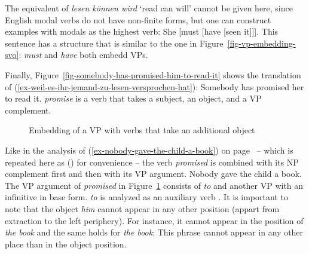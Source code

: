 The equivalent of \emph{lesen können wird} `read can will' cannot be given here, since English modal
verbs do not have non-finite forms, but one can construct examples with modals as the highest verb:
\ea
She [must [have [seen it]]].
\z
This sentence has a structure that is similar to the one in Figure~\ref{fig-vp-embedding-svo}:
\emph{must} and \emph{have} both embedd VPs.

Finally, Figure~\vref{fig-somebody-has-promised-him-to-read-it} shows the translation of
(\ref{ex-weil-es-ihr-jemand-zu-lesen-versprochen-hat}):
\ea
Somebody has promised her to read it.
\z
\emph{promise} is a verb that takes a subject, an object, and a VP complement. 
\begin{figure}
\caption{\label{fig-somebody-has-promised-him-to-read-it}Embedding of a VP with verbs that take an
  additional object}
\end{figure}
Like in the analysis of (\ref{ex-nobody-gave-the-child-a-book}) on
page~\pageref{ex-nobody-gave-the-child-a-book} -- which is repeated here as () for convenience
-- the verb \emph{promised} is combined with its NP complement first and then with its VP
argument.
\ea
\label{ex-nobody-gave-the-child-a-book-three}
Nobody gave the child a book.
\z 
The VP argument of \emph{promised} in Figure~\ref{fig-somebody-has-promised-him-to-read-it} consists of \emph{to} and another VP with an infinitive in base form. \emph{to} is
analyzed as an auxiliary verb \parencites[]{GPS82a-u}[]{Sag2020a}.
It is important to note that the object \emph{him} cannot appear in any other position (appart from
extraction to the left periphery). For instance, it cannot appear in the position of \emph{the book}
and the same holds for \emph{the book}: This phrase cannot appear in any other place than in the
object position.


